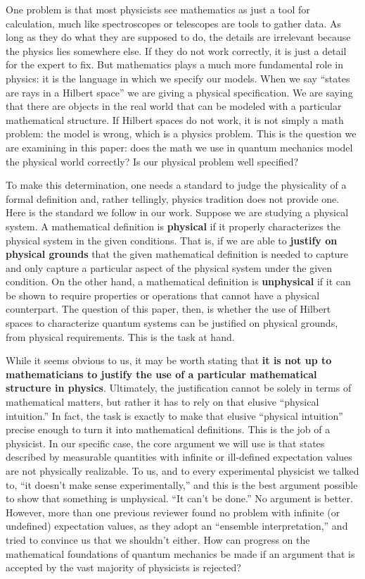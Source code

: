 \documentclass[10pt,twocolumn, nofootinbib]{revtex4-2}
\begin{document}
One problem is that most physicists see mathematics as just a tool for calculation, much like spectroscopes or telescopes are tools to gather data. As long as they do what they are supposed to do, the details are irrelevant because the physics lies somewhere else. If they do not work correctly, it is just a detail for the expert to fix. But mathematics plays a much more fundamental role in physics: it is the language in which we specify our models. When we say ``states are rays in a Hilbert space'' we are giving a physical specification. We are saying that there are objects in the real world that can be modeled with a particular mathematical structure. If Hilbert spaces do not work, it is not simply a math problem: the model is wrong, which is a physics problem. This is the question we are examining in this paper: does the math we use in quantum mechanics model the physical world correctly? Is our physical problem well specified?

To make this determination, one needs a standard to judge the physicality of a formal definition\cite{redei_tension_2020, north_physics_2021} and, rather tellingly, physics tradition does not provide one. Here is the standard we follow in our work.\cite{aop-book}  Suppose we are studying a physical system. A mathematical definition is \textbf{physical} if it properly characterizes the physical system in the given conditions. That is, if we are able to \textbf{justify on physical grounds} that the given mathematical definition is needed to capture and only capture a particular aspect of the physical system under the given condition. On the other hand, a mathematical definition is \textbf{unphysical} if it can be shown to require properties or operations that cannot have a physical counterpart. The question of this paper, then, is whether the use of Hilbert spaces to characterize quantum systems can be justified on physical grounds, from physical requirements. This is the task at hand.

While it seems obvious to us, it may be worth stating that \textbf{it is not up to mathematicians to justify the use of a particular mathematical structure in physics}. Ultimately, the justification cannot be solely in terms of mathematical matters, but rather it has to rely on that elusive ``physical intuition.'' In fact, the task is exactly to make that elusive ``physical intuition'' precise enough to turn it into mathematical definitions. This is the job of a physicist. In our specific case, the core argument we will use is that states described by measurable quantities with infinite or ill-defined expectation values are not physically realizable. To us, and to every experimental physicist we talked to, ``it doesn't make sense experimentally,'' and this is the best argument possible to show that something is unphysical. ``It can't be done.'' No argument is better. However, more than one previous reviewer found no problem with infinite (or undefined) expectation values, as they adopt an ``ensemble interpretation,'' and tried to convince us that we shouldn't either. How can progress on the mathematical foundations of quantum mechanics be made if an argument that is accepted by the vast majority of physicists is rejected?
\end{document}

